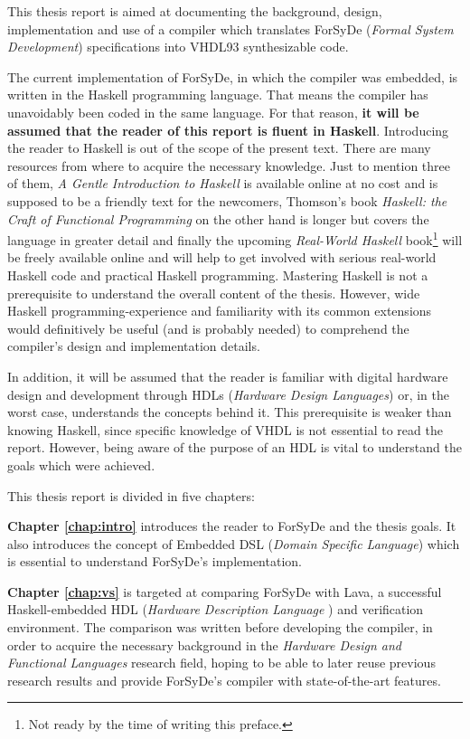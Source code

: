 This thesis report is aimed at documenting the background, design,
implementation and use of a compiler which translates ForSyDe (\textit{Formal
  System Development}) specifications into VHDL93 \cite{vhdl93} synthesizable
code.

The current implementation of ForSyDe, in which the compiler was embedded,
is written in the Haskell \cite{haskell} programming language. That
means the compiler has unavoidably been coded in the same
language. For that reason, \textbf{it will be assumed that the reader
of this report is fluent in Haskell}. Introducing the reader to
Haskell is out of the scope of the present text. There are many
resources from where to acquire the necessary knowledge. Just to
mention three of them, \textit{A Gentle Introduction to
Haskell} \cite{haskellgentle} is available online at no cost and is
supposed to be a friendly text for the newcomers, Thomson's book
\textit{Haskell: the Craft of Functional Programming} \cite{craft} on
the other hand is longer but covers the language in greater detail and
finally the upcoming \textit{Real-World Haskell} book\footnote{Not
ready by the time of writing this preface.} \cite{realworldhaskell}
will be freely available online and will help to get involved with
serious real-world Haskell code and practical Haskell
programming. Mastering Haskell is not a prerequisite to understand the
overall content of the thesis. However, wide Haskell
programming-experience and familiarity with its common extensions
would definitively be useful (and is probably needed) to comprehend
the compiler's design and implementation details.

In addition, it will be assumed that the reader is familiar with
digital hardware design and development through HDLs (\textit{Hardware
Design Languages}) or, in the worst case, understands the concepts
behind it. This prerequisite is weaker than knowing Haskell, since
specific knowledge of VHDL is not essential to read the
report. However, being aware of the purpose of an HDL is vital to
understand the goals which were achieved.

This thesis report is divided in five chapters:

\textbf{Chapter \ref{chap:intro}} introduces the reader to ForSyDe and
the thesis goals. It also introduces the concept of Embedded DSL
(\textit{Domain Specific Language}) which is essential to understand
ForSyDe's implementation.

\textbf{Chapter \ref{chap:vs}} is targeted at comparing ForSyDe with
Lava, a successful Haskell-embedded HDL (\textit{Hardware Description
Language} ) and verification environment. The comparison was written
before developing the compiler, in order to acquire the necessary
background in the \textit{Hardware Design and Functional Languages}
research field, hoping to be able to later reuse previous research
results and provide ForSyDe's compiler with state-of-the-art features.

